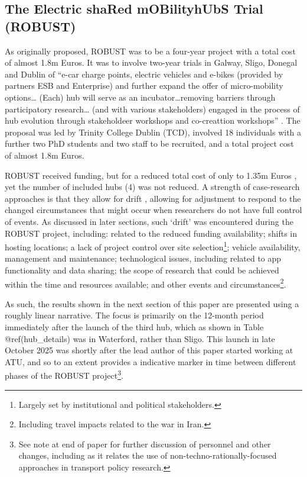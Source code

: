 \documentclass[preprint, 3p,
authoryear]{elsarticle} %
\begin{document}
\subsection{The Electric shaRed mOBilityhUbS Trial
(ROBUST)}\label{the-electric-shared-mobilityhubs-trial-robust}

As originally proposed, ROBUST was to be a four-year project with a
total cost of almost 1.8m Euros. It was to involve two-year trials in
Galway, Sligo, Donegal and Dublin of ``e-car charge points, electric
vehicles and e-bikes (provided by partners ESB and Enterprise) and
further expand the offer of micro-mobility options\ldots{} (Each) hub
will serve as an incubator\ldots removing barriers through participatory
research\ldots{} (and with various stakeholders) engaged in the process
of hub evolution through stakeholdeer workshops and co-creattion
workshops'' \citep[p.3]{Stefaniec:2022aa}. The proposal was led by
Trinity College Dublin (TCD), involved 18 individuals with a further two
PhD students and two staff to be recruited, and a total project cost of
almost 1.8m Euros.

ROBUST received funding, but for a reduced total cost of only to 1.35m
Euros \citet{Sustainable-Energy-Authority-of-Ireland-SEAI:0aa}, yet the
number of included hubs (4) was not reduced. A strength of case-research
approaches is that they allow for drift \citep[\citet{Bonoma:1984aa},
\citet{Voss:2002aa}]{Benbasat:1987aa}, allowing for adjustment to
respond to the changed circumstances that might occur when researchers
do not have full control of events. As discussed in later sections, such
`drift' was encountered during the ROBUST project, including: related to
the reduced funding availability; shifts in hosting locations; a lack of
project control over site selection\footnote{Largely set by
  institutional and political stakeholders.}; vehicle availability,
management and maintenance; technological issues, including related to
app functionality and data sharing; the scope of research that could be
achieved within the time and resources available; and other events and
circumstances\footnote{Including travel impacts related to the war in
  Iran.}.

As such, the results shown in the next section of this paper are
presented using a roughly linear narrative. The focus is primarily on
the 12-month period immediately after the launch of the third hub, which
as shown in Table @ref(hub\_details) was in Waterford, rather than
Sligo. This launch in late October 2025 was shortly after the lead
author of this paper started working at ATU, and so to an extent
provides a indicative marker in time between different phases of the
ROBUST project\footnote{See note at end of paper for further discussion
  of personnel and other changes, including as it relates the use of
  non-techno-rationally-focused approaches in transport policy research.}.
\end{document}
